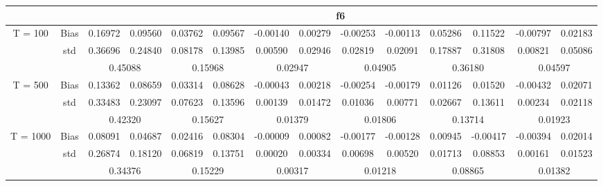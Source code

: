 \documentclass[a4paper,12pt,times,numbered,print,index]{report}
\numberwithin{equation}{section}
\begin{document}
\begin{table}[htbp]
\begin{adjustbox}{max width=\textwidth}
\begin{tabular}{cccccccccccccc}
		\midrule
		&       & \multicolumn{12}{c}{f6} \\
		\midrule
		T = 100 & Bias  & 0.16972 & 0.09560 & 0.03762 & 0.09567 & -0.00140 & 0.00279 & -0.00253 & -0.00113 & 0.05286 & 0.11522 & -0.00797 & 0.02183 \\
		& std   & 0.36696 & 0.24840 & 0.08178 & 0.13985 & 0.00590 & 0.02946 & 0.02819 & 0.02091 & 0.17887 & 0.31808 & 0.00821 & 0.05086 \\
		&       & \multicolumn{2}{c}{\textcolor[rgb]{ .329,  .51,  .208}{0.45088}} & \multicolumn{2}{c}{0.15968} & \multicolumn{2}{c}{0.02947} & \multicolumn{2}{c}{\textcolor[rgb]{ .329,  .51,  .208}{0.04905}} & \multicolumn{2}{c}{0.36180} & \multicolumn{2}{c}{0.04597} \\
		\multirow{3}[0]{*}{T = 500} & Bias  & 0.13362 & 0.08659 & 0.03314 & 0.08628 & -0.00043 & 0.00218 & -0.00254 & -0.00179 & 0.01126 & 0.01520 & -0.00432 & 0.02071 \\
		& std   & 0.33483 & 0.23097 & 0.07623 & 0.13596 & 0.00139 & 0.01472 & 0.01036 & 0.00771 & 0.02667 & 0.13611 & 0.00234 & 0.02118 \\
		&       & \multicolumn{2}{c}{0.42320} & \multicolumn{2}{c}{0.15627} & \multicolumn{2}{c}{0.01379} & \multicolumn{2}{c}{0.01806} & \multicolumn{2}{c}{0.13714} & \multicolumn{2}{c}{0.01923} \\
		\multirow{3}[1]{*}{T = 1000} & Bias  & 0.08091 & 0.04687 & 0.02416 & 0.08304 & -0.00009 & 0.00082 & -0.00177 & -0.00128 & 0.00945 & -0.00417 & -0.00394 & 0.02014 \\
		& std   & 0.26874 & 0.18120 & 0.06819 & 0.13751 & 0.00020 & 0.00334 & 0.00698 & 0.00520 & 0.01713 & 0.08853 & 0.00161 & 0.01523 \\
		&       & \multicolumn{2}{c}{0.34376} & \multicolumn{2}{c}{0.15229} & \multicolumn{2}{c}{0.00317} & \multicolumn{2}{c}{0.01218} & \multicolumn{2}{c}{0.08865} & \multicolumn{2}{c}{0.01382} \\
		\bottomrule
		\bottomrule
    	\end{tabular}%
		\end{adjustbox}
\label{nonco-f12}%
\end{table}%
\end{document}
